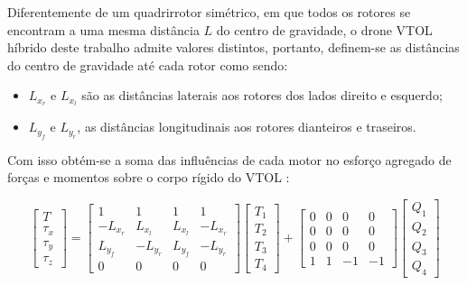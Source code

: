 Diferentemente de um quadrirrotor simétrico, em que todos os rotores se encontram a uma mesma distância $L$ do centro de gravidade, o drone VTOL híbrido deste trabalho admite valores distintos, portanto, definem-se as distâncias do centro de gravidade até cada rotor como sendo: 

\begin{itemize}
  \item $L_{x_r}$ e $L_{x_l}$ são as distâncias laterais aos rotores dos lados direito e esquerdo;
  \item $L_{y_f}$ e $L_{y_r}$, as distâncias longitudinais aos rotores dianteiros e traseiros. 
\end{itemize}

Com isso obtém-se a soma das influências de cada motor no esforço agregado de forças e momentos sobre o corpo rígido do VTOL \cite{Quan2017}:

\begin{equation}
    \begin{bmatrix} T \\ \tau_x \\ \tau_y \\ \tau_z \end{bmatrix}
    =
    \begin{bmatrix}
        1        & 1        & 1        & 1        \\
        -L_{x_r} & L_{x_l}  & L_{x_l}  & -L_{x_r} \\
        L_{y_f}  & -L_{y_r} & L_{y_f}  & -L_{y_r} \\
        0        & 0        & 0        & 0
    \end{bmatrix}
    \begin{bmatrix} T_1 \\ T_2 \\ T_3 \\ T_4 \end{bmatrix}
    +
    \begin{bmatrix}
        0 & 0 & 0 & 0 \\
        0 & 0 & 0 & 0 \\
        0 & 0 & 0 & 0 \\
        1 & 1 & -1 & -1
    \end{bmatrix}
    \begin{bmatrix} Q_1 \\ Q_2 \\ Q_3 \\ Q_4 \end{bmatrix}
    \label{eq:alocacao-detalhe}
\end{equation}

